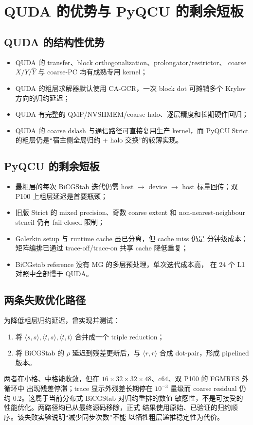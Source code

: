 \documentclass[UTF8,a4paper,11pt]{ctexart}
\newcommand{\Yhat}{\widehat Y}
\begin{document}
\section{QUDA 的优势与 PyQCU 的剩余短板}

\subsection{QUDA 的结构性优势}

\begin{itemize}
\item QUDA 的 transfer、block orthogonalization、prolongator/restrictor、
  coarse \(X/Y/\Yhat\) 与 coarse-PC 均有成熟专用 kernel；
\item QUDA 的粗层求解器默认使用 CA-GCR，一次 block dot 可摊销多个
  Krylov 方向的归约延迟；
\item QUDA 有完整的 QMP/NVSHMEM/coarse halo、逐层精度和长期硬件回归；
\item QUDA 的 coarse dslash 与通信路径可直接复用生产 kernel，而
  PyQCU Strict 的粗层仍是“宿主侧全局归约 + halo 交换”的较薄实现。
\end{itemize}

\subsection{PyQCU 的剩余短板}

\begin{itemize}
\item 最粗层的每次 BiCGStab 迭代仍需 host \(\to\) device \(\to\)
  host 标量回传；双 P100 上粗层延迟是首要瓶颈；
\item 旧版 Strict 的 mixed precision、奇数 coarse extent 和
  non-nearest-neighbour stencil 仍有 fail-closed 限制；
\item Galerkin setup 与 runtime cache 虽已分离，但 cache miss 仍是
  分钟级成本；矩阵编排已通过 trace-off/trace-on 共享 cache 降低重复；
\item BiCGstab reference 没有 MG 的多层预处理，单次迭代成本高，
  在 24 个 L1 对照中全部慢于 QUDA。
\end{itemize}

\subsection{两条失败优化路径}

为降低粗层归约延迟，曾实现并测试：
\begin{enumerate}
\item 将 \(\langle s,s\rangle,\langle t,s\rangle,\langle t,t\rangle\)
  合并成一个 triple reduction；
\item 将 BiCGStab 的 \(\rho\) 延迟到残差更新后，与
  \(\langle r,r\rangle\) 合成 dot-pair，形成 pipelined 版本。
\end{enumerate}
两者在小格、中格能收敛，但在
\(16\times32\times32\times48\)、c64、双 P100 的 FGMRES 外循环中
出现残差停滞；trace 显示外残差长期停在 \(10^{-3}\) 量级而 coarse
residual 仍约 \(0.2\)。这属于当前分布式 BiCGStab 对归约重排的数值
敏感性，不是可接受的性能优化。两路径均已从最终源码移除，正式
结果使用原始、已验证的归约顺序。该失败实验说明“减少同步次数”不能
以牺牲粗层递推稳定性为代价。
\end{document}
